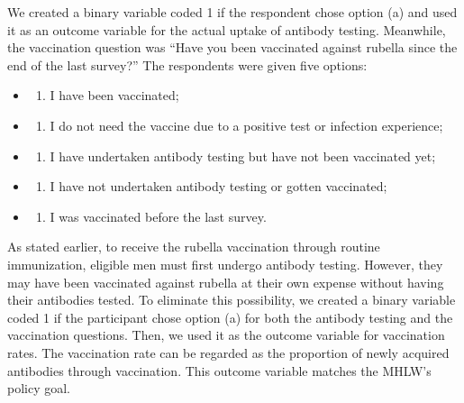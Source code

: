 \documentclass[
    a4paper
]{article}
\providecommand{\tightlist}{%
  \setlength{\itemsep}{0pt}\setlength{\parskip}{0pt}}
\begin{document}
We created a binary variable coded 1 if the respondent chose option (a) and used it as an outcome variable for the actual uptake of antibody testing. Meanwhile, the vaccination question was ``Have you been vaccinated against rubella since the end of the last survey?'' The respondents were given five options:

\begin{itemize}
\item
  \begin{enumerate}
  \def\labelenumi{(\alph{enumi})}
  \tightlist
  \item
    I have been vaccinated;
  \end{enumerate}
\item
  \begin{enumerate}
  \def\labelenumi{(\alph{enumi})}
  \setcounter{enumi}{1}
  \tightlist
  \item
    I do not need the vaccine due to a positive test or infection experience;
  \end{enumerate}
\item
  \begin{enumerate}
  \def\labelenumi{(\alph{enumi})}
  \setcounter{enumi}{2}
  \tightlist
  \item
    I have undertaken antibody testing but have not been vaccinated yet;
  \end{enumerate}
\item
  \begin{enumerate}
  \def\labelenumi{(\alph{enumi})}
  \setcounter{enumi}{3}
  \tightlist
  \item
    I have not undertaken antibody testing or gotten vaccinated;
  \end{enumerate}
\item
  \begin{enumerate}
  \def\labelenumi{(\alph{enumi})}
  \setcounter{enumi}{4}
  \tightlist
  \item
    I was vaccinated before the last survey.
  \end{enumerate}
\end{itemize}

As stated earlier, to receive the rubella vaccination through routine immunization, eligible men must first undergo antibody testing. However, they may have been vaccinated against rubella at their own expense without having their antibodies tested. To eliminate this possibility, we created a binary variable coded 1 if the participant chose option (a) for both the antibody testing and the vaccination questions. Then, we used it as the outcome variable for vaccination rates. The vaccination rate can be regarded as the proportion of newly acquired antibodies through vaccination. This outcome variable matches the MHLW's policy goal.
\end{document}

